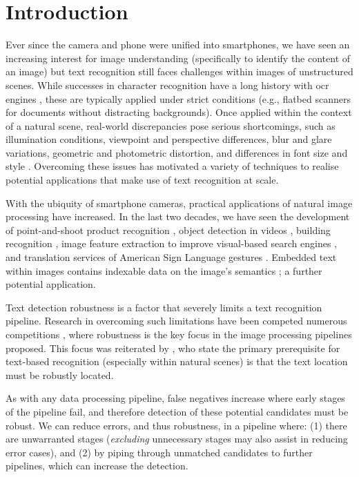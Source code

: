\chapter{Introduction}
\label{ch:introduction}

Ever since the camera and phone were unified into smartphones, we have seen an increasing interest for image understanding (specifically to identify the content of an image) but text recognition still faces challenges within images of unstructured scenes. While successes in character recognition have a long history with \gls{ocr} engines \citep{Smith:1987tg}, these are typically applied under strict conditions (e.g., flatbed scanners for documents without distracting backgrounds). Once applied within the context of a natural scene, real-world discrepancies pose serious shortcomings, such as illumination conditions, viewpoint and perspective differences, blur and glare variations, geometric and photometric distortion, and differences in font size and style \citep{Zhang:2008vfa, Jung:2004uw}. Overcoming these issues has motivated a variety of techniques to realise potential applications that make use of text recognition at scale.

With the ubiquity of smartphone cameras, practical applications of natural image processing have increased. In the last two decades, we have seen the development of point-and-shoot product recognition \citep{Tsai:2010cn,Girod:2011gw}, object detection in videos \citep{Sivic:2003tj}, building recognition \citep{Takacs:2008cg}, image feature extraction to improve visual-based search engines \citep{Lowe:2004kp,Bay:2008ud}, and translation services of American Sign Language gestures \citep{Jin:2016jd}. Embedded text within images contains indexable data on the image's semantics \citep{Smeulders:2000tx}; a further potential application.

Text detection robustness is a factor that severely limits a text recognition pipeline. Research in overcoming such limitations have been competed numerous competitions \citep{Lucas:2003iw, Lucas:2005bq, Shahab:2011hq, Hua:2004vf}, where robustness is the key focus in the image processing pipelines proposed. This focus was reiterated by \citet{Chen:2011ul}, who state the primary prerequisite for text-based recognition (especially within natural scenes) is that the text location must be robustly located.

As with any data processing pipeline, false negatives increase where early stages of the pipeline fail, and therefore detection of these potential candidates must be robust. We can reduce errors, and thus robustness, in a pipeline where: (1) there are unwarranted stages (\textit{excluding} unnecessary stages may also assist in reducing error cases), and (2) by piping through unmatched candidates to further pipelines, which can increase the detection.

